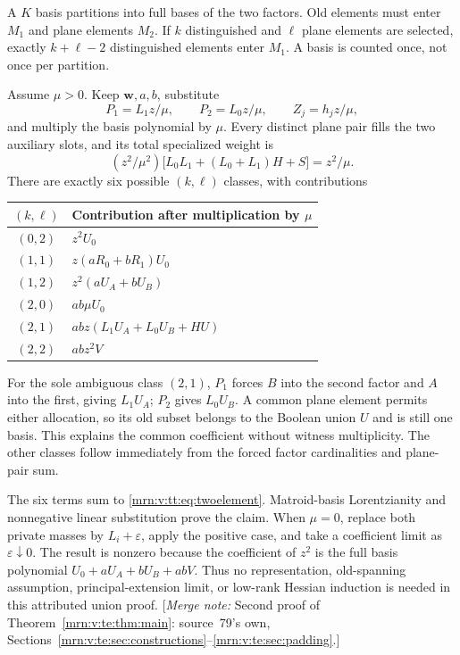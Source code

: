 \documentclass[11pt,a4paper]{article}
\theoremstyle{remark}\newtheorem{remark}[theorem]{Remark}
\newcommand{\mnote}[1]{[\textit{Merge note:} #1]}
\begin{document}
A $K$ basis partitions into full bases of the two factors. Old elements must enter $M_1$ and plane elements $M_2$. If $k$ distinguished and $\ell$ plane elements are selected, exactly $k+\ell-2$ distinguished elements enter $M_1$. A basis is counted once, not once per partition.

Assume $\mu>0$. Keep $\mathbf w,a,b$, substitute
\[
 P_1=L_1z/\mu,\qquad P_2=L_0z/\mu,\qquad Z_j=h_jz/\mu,
\]
and multiply the basis polynomial by $\mu$. Every distinct plane pair fills the two auxiliary slots, and its total specialized weight is
\[
 (z^2/\mu^2)\bigl[L_0L_1+(L_0+L_1)H+S\bigr]=z^2/\mu.
\]
There are exactly six possible $(k,\ell)$ classes, with contributions
\begin{center}
\begin{tabular}{@{}cl@{}}\toprule
$(k,\ell)$&Contribution after multiplication by $\mu$\\\midrule
$(0,2)$&$z^2U_0$\\
$(1,1)$&$z(aR_0+bR_1)U_0$\\
$(1,2)$&$z^2(aU_A+bU_B)$\\
$(2,0)$&$ab\mu U_0$\\
$(2,1)$&$abz(L_1U_A+L_0U_B+HU)$\\
$(2,2)$&$abz^2V$\\\bottomrule
\end{tabular}
\end{center}
For the sole ambiguous class $(2,1)$, $P_1$ forces $B$ into the second factor and $A$ into the first, giving $L_1U_A$; $P_2$ gives $L_0U_B$. A common plane element permits either allocation, so its old subset belongs to the Boolean union $U$ and is still one basis. This explains the common coefficient without witness multiplicity. The other classes follow immediately from the forced factor cardinalities and plane-pair sum.

The six terms sum to \eqref{mrn:v:tt:eq:twoelement}. Matroid-basis Lorentzianity and nonnegative linear substitution prove the claim. When $\mu=0$, replace both private masses by $L_i+\varepsilon$, apply the positive case, and take a coefficient limit as $\varepsilon\downarrow0$. The result is nonzero because the coefficient of $z^2$ is the full basis polynomial $U_0+aU_A+bU_B+abV$. Thus no representation, old-spanning assumption, principal-extension limit, or low-rank Hessian induction is needed in this attributed union proof.
\mnote{Second proof of Theorem~\ref{mrn:v:te:thm:main}: source~79's own,
Sections~\ref{mrn:v:te:sec:constructions}--\ref{mrn:v:te:sec:padding}.}
\end{document}
